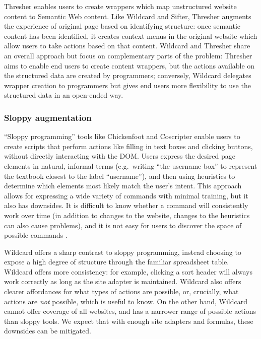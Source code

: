 \documentclass[english,submission]{programming}
\begin{document}
Thresher \autocite{hogue2005} enables users to create wrappers which map
unstructured website content to Semantic Web content. Like Wildcard and
Sifter, Thresher augments the experience of original page based on
identifying structure: once semantic content has been identified, it
creates context menus in the original website which allow users to take
actions based on that content. Wildcard and Thresher share an overall
approach but focus on complementary parts of the problem: Thresher aims
to enable end users to create content wrappers, but the actions
available on the structured data are created by programmers; conversely,
Wildcard delegates wrapper creation to programmers but gives end users
more flexibility to use the structured data in an open-ended way.

\hypertarget{sloppy-augmentation}{%
\subsubsection{Sloppy augmentation}\label{sloppy-augmentation}}

``Sloppy programming'' \autocite{little2010} tools like Chickenfoot
\autocite{bolin2005} and Coscripter \autocite{leshed2008} enable users
to create scripts that perform actions like filling in text boxes and
clicking buttons, without directly interacting with the DOM. Users
express the desired page elements in natural, informal terms
(e.g.~writing ``the username box'' to represent the textbook closest to
the label ``username''), and then using heuristics to determine which
elements most likely match the user's intent. This approach allows for
expressing a wide variety of commands with minimal training, but it also
has downsides. It is difficult to know whether a command will
consistently work over time (in addition to changes to the website,
changes to the heuristics can also cause problems), and it is not easy
for users to discover the space of possible commands
\autocite{little2010}.

Wildcard offers a sharp contrast to sloppy programming, instead choosing
to expose a high degree of structure through the familiar spreadsheet
table. Wildcard offers more consistency: for example, clicking a sort
header will always work correctly as long as the site adapter is
maintained. Wildcard also offers clearer affordances for what types of
actions are possible, or, crucially, what actions are \emph{not}
possible, which is useful to know. On the other hand, Wildcard cannot
offer coverage of all websites, and has a narrower range of possible
actions than sloppy tools. We expect that with enough site adapters and
formulas, these downsides can be mitigated.
\end{document}
